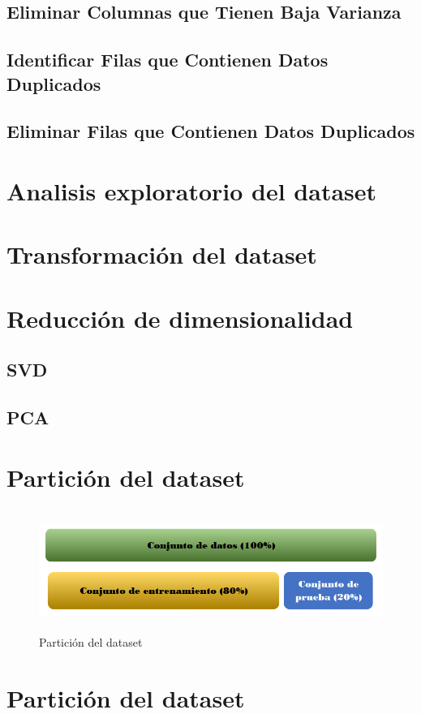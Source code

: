     \subsection{ Eliminar Columnas que Tienen Baja Varianza}
    \subsection{ Identificar Filas que Contienen Datos Duplicados}
    \subsection{ Eliminar Filas que Contienen Datos Duplicados}



\section{Analisis exploratorio del dataset}

\section{Transformación del dataset}

\section{Reducción de dimensionalidad}

\subsection{SVD}
\subsection{PCA}

\section{Partición del dataset}

    \begin{figure} [H]
        \centering
        \includegraphics[width=12cm, height=4cm ]{Imagenes/ParticionDEdatos.PNG }
        \caption{Partición del dataset}
        \label{fig:parti}
    \end{figure}

\section{Partición del dataset}



